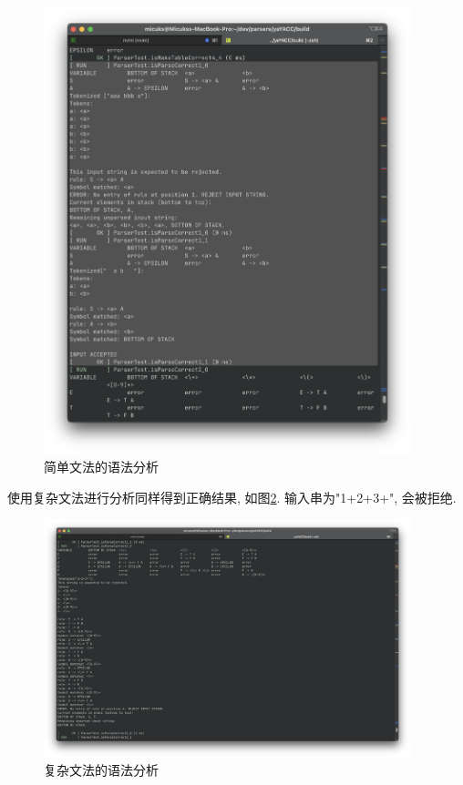 \begin{figure}[ht!]
	\begin{center}
		\includegraphics[width=0.95\textwidth]{figures/ll1分析输入1.png}
	\end{center}
	\caption{简单文法的语法分析}
	\label{fig:简单文法的语法分析}
\end{figure}

使用复杂文法进行分析同样得到正确结果, 如图\ref{fig:复杂文法的语法分析}.
输入串为"1+2+3+", 会被拒绝.

\begin{figure}[ht!]
	\begin{center}
		\includegraphics[width=0.95\textwidth]{figures/ll1分析输入20.png}
	\end{center}
	\caption{复杂文法的语法分析}
	\label{fig:复杂文法的语法分析}
\end{figure}

